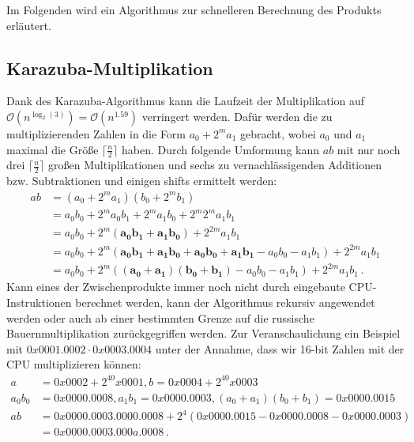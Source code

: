 \documentclass[course=erap]{aspdoc}
\begin{document}
Im Folgenden wird ein Algorithmus zur schnelleren Berechnung des Produkts erläutert.

\subsection{Karazuba-Multiplikation}
Dank des Karazuba-Algorithmus kann die Laufzeit der Multiplikation auf $\mathcal{O}(n^{\log_2(3)}) = \mathcal{O}(n^{1.59})$\cite{the_art_of_programming} verringert werden.
Dafür werden die zu multiplizierenden Zahlen in die Form $a_0+2^ma_1$ gebracht, wobei $a_0$ und $a_1$ maximal die Größe $\lceil\frac{n}{2}\rceil$ haben.
Durch folgende Umformung kann $ab$ mit nur noch drei $\lceil\frac{n}{2}\rceil$ großen Multiplikationen und sechs zu vernachlässigenden Additionen bzw. Subtraktionen und einigen shifts ermittelt werden:
\begin{align*}
a b &= (a_0+2^ma_1) (b_0+2^mb_1)\\
      &= a_0b_0 + 2^ma_0b_1 + 2^ma_1b_0 + 2^m2^ma_1b_1\\
      &= a_0b_0 + 2^m(\mathbf{a_0b_1 + a_1b_0}) + 2^{2m}a_1b_1\\
      &= a_0b_0 + 2^m(\mathbf{a_0b_1 + a_1b_0 + a_0b_0 + a_1b_1} - a_0b_0 - a_1b_1) + 2^{2m}a_1b_1\\
      &= a_0b_0 + 2^m(\mathbf{(a_0+a_1)(b_0+b_1)} - a_0b_0 - a_1b_1) + 2^{2m}a_1b_1 \, .
\end{align*}
Kann eines der Zwischenprodukte immer noch nicht durch eingebaute CPU-Instruktionen berechnet werden, kann der Algorithmus rekursiv angewendet werden oder auch ab einer bestimmten Grenze auf die russische Bauernmultiplikation zurückgegriffen werden.
Zur Veranschaulichung ein Beispiel mit $0x0001.0002 \cdot 0x0003.0004$ unter der Annahme, dass wir 16-bit Zahlen mit der CPU multiplizieren können:
\begin{align*}
      a &= 0x0002 + 2^40x0001, b = 0x0004 + 2^40x0003 \\
      a_0b_0 &= 0x0000.0008, a_1b_1 = 0x0000.0003, (a_0+a_1)(b_0+b_1) = 0x0000.0015 \\
      ab &= 0x0000.0003.0000.0008 + 2^4(0x0000.0015-0x0000.0008-0x0000.0003) \\
      &= 0x0000.0003.000a.0008 \, .
\end{align*}
\end{document}
